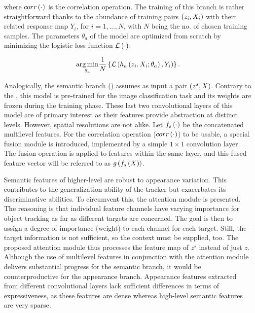 \noindent where ${corr} \left( \cdot \right)$ is the correlation operation. The training of this branch is rather straightforward thanks to the abundance of training pairs $\left( {z_i, X_i} \right)$ with their related response map $Y_i$, for $i = 1, \dots, N$, with $N$ being the no. of chosen training samples. The parameters $\theta_a$ of the  model are optimized from scratch by minimizing the logistic loss function ${\mathcal{L}} \left( \cdot \right)$:

\begin{equation}
    \label{eq:ANetModelTraining}
    \underset{\theta_a}{\operatorname*{arg\,min}}
    \frac{1}{N}
    \left\{ {
        {\mathcal{L}} \left( 
            {h_a} \left( z_i, X_i; \theta_a \right),
            Y_i
         \right)
    } \right\}.
\end{equation}

Analogically, the semantic branch () assumes as input a pair $\left( {z^s, X} \right)$. Contrary to the , this model is pre-trained for the image classification task and its weights are frozen during the training phase. These last two convolutional layers of this model are of primary interest as their features provide abstraction at distinct levels. However, spatial resolutions are not alike. Let ${f_s} \left( \cdot \right)$ be the concatenated multilevel features. For the correlation operation (${corr} \left( \cdot \right)$) to be usable, a special fusion module is introduced, implemented by a simple $1 \times 1$ convolution layer. The fusion operation is applied to features within the same layer, and this fused feature vector will be referred to as ${g} \left( {f_s} \left( X \right) \right)$.

Semantic features of higher-level are robust to appearance variation. This contributes to the generalization ability of the tracker but exacerbates its discriminative abilities. To circumvent this, the attention module is presented. The reasoning is that individual feature channels have varying importance for object tracking as far as different targets are concerned. The goal is then to assign a degree of importance (weight) to each channel for each target. Still, the target information is not sufficient, so the context must be supplied, too. The proposed attention module thus processes the feature map of $z^s$ instead of just $z$. Although the use of multilevel features in conjunction with the attention module delivers substantial progress for the semantic branch, it would be counterproductive for the appearance branch. Appearance features extracted from different convolutional layers lack sufficient differences in terms of expressiveness, as these features are dense whereas high-level semantic features are very sparse.

